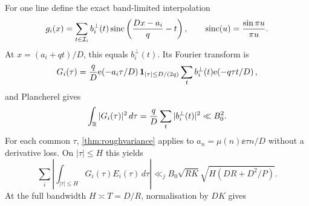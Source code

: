 For one line define the exact band-limited interpolation
\begin{equation}\label{eq:cardinal-g}
 g_i(x)=\sum_{t\in\mathcal I_i}b_i^\perp(t)
  \operatorname{sinc}\left(\frac{Dx-a_i}{q}-t\right),
 \qquad \operatorname{sinc}(u)=\frac{\sin\pi u}{\pi u}.
\end{equation}
At $x=(a_i+qt)/D$, this equals $b_i^\perp(t)$.  Its Fourier transform is
\begin{equation}\label{eq:cardinal-G}
 G_i(\tau)=\frac qD\mathrm e\!\left(-a_i\tau/D\right)
   \mathbf 1_{|\tau|\le D/(2q)}
   \sum_tb_i^\perp(t)\mathrm e\!\left(-q\tau t/D\right),
\end{equation}
and Plancherel gives
\begin{equation}\label{eq:cardinal-energy}
      \int_{\mathbb R}|G_i(\tau)|^2\,d\tau
       =\frac qD\sum_t|b_i^\perp(t)|^2\ll B_0^2.
\end{equation}
For each common $\tau$, \cref{thm:roughvariance} applies to
$a_n=\mu(n)\ee{\tau n/D}$ without a derivative loss.  On $|\tau|\le H$ this
yields
\begin{equation}\label{eq:cardinal-bound}
 \sum_i\left|\int_{|\tau|\le H}G_i(\tau)E_i(\tau)\,d\tau\right|
 \ll_jB_0\sqrt{RK}\sqrt{H\left(DR+D^2/P\right)}.
\end{equation}
At the full bandwidth $H\asymp T=D/R$, normalisation by $DK$ gives
